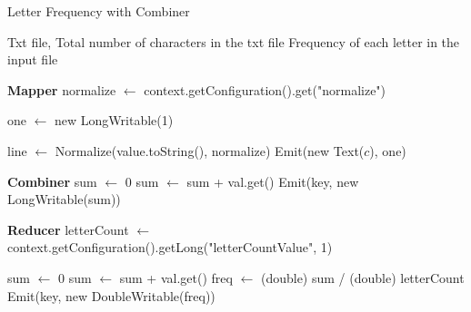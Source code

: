 \begin{algorithm}[H]
    \caption{Letter Frequency with Combiner}
    \begin{algorithmic}[1]
        \Require Txt file, Total number of characters in the txt file
        \Ensure Frequency of each letter in the input file

        \vspace{1em}

        \Statex
        \noindent \textbf{Mapper}
        \State normalize $\leftarrow$ context.getConfiguration().get("normalize")

        \State one $\leftarrow$ new LongWritable(1)

        \EndProcedure

        \vspace{1em}

        \State line $\leftarrow$ Normalize(value.toString(), normalize) 
        \State Emit(new Text($c$), one)
        \EndFor
        \EndProcedure

        \vspace{1em}

        \Statex
        \noindent \textbf{Combiner}
        \State sum $\leftarrow$ 0
        \State sum $\leftarrow$ sum + val.get()
        \EndFor
        \State Emit(key, new LongWritable(sum))
        \EndProcedure

        \vspace{1em}

        \Statex
        \noindent \textbf{Reducer}
        \State letterCount $\leftarrow$ context.getConfiguration().getLong("letterCountValue", 1)
        \EndProcedure

        \vspace{1em}

        \State sum $\leftarrow$ 0
        \State sum $\leftarrow$ sum + val.get()
        \EndFor
        \State freq $\leftarrow$ (double) sum / (double) letterCount
        \State Emit(key, new DoubleWritable(freq))
        \EndProcedure
    \end{algorithmic}
\end{algorithm}
